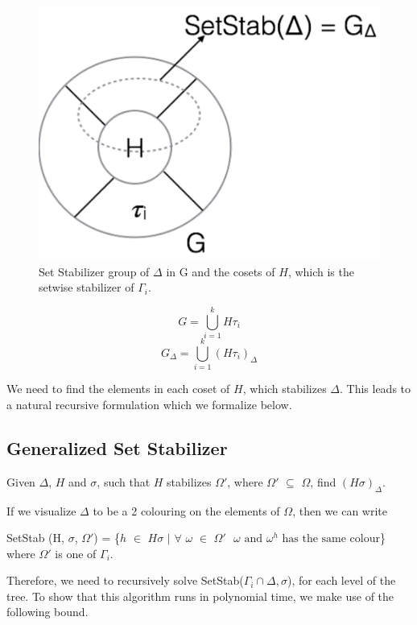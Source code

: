 \begin{figure}[htp!]
	\centering
	\includegraphics[scale=0.5]{images/setstabgroup.pdf}
	\caption{Set Stabilizer group of $\Delta$ in G and the cosets of $H$, which is the setwise stabilizer of $\Gamma_{i}$.}
	\label{fig:setstabgroup}
\end{figure}

\[ G =  \bigcup_{i=1}^kH\tau_{i} \]
\[ G_{\Delta} = \bigcup_{i=1}^k(H\tau_{i})_{\Delta} \]

We need to find the elements in each coset of $H$, which stabilizes $\Delta$. This leads to a natural recursive formulation which we formalize below. 

\subsection{Generalized Set Stabilizer} 
Given $\Delta$, $H$ and $\sigma$, such that $H$ stabilizes $\Omega'$, where $\Omega'$ $\subseteq$ $\Omega$, find $(H\sigma)_{\Delta}$. 

If we visualize $\Delta$ to be a 2 colouring on the elements of $\Omega$, then we can write
\begin{center}
SetStab (H, $\sigma$, $\Omega'$) = \{$h$ $\in$ $H\sigma$ $|$ $\forall$ $\omega$ $\in$ $\Omega' \text{ $\omega$ and $\omega^{h}$ has the same colour}$\}
where $\Omega'$ is one of $\Gamma_{i}$.
\end{center}

Therefore, we need to recursively solve SetStab($\Gamma_{i} \cap \Delta, \sigma$), for each level of the tree. To show that this algorithm runs in polynomial time, we make use of the following bound.

